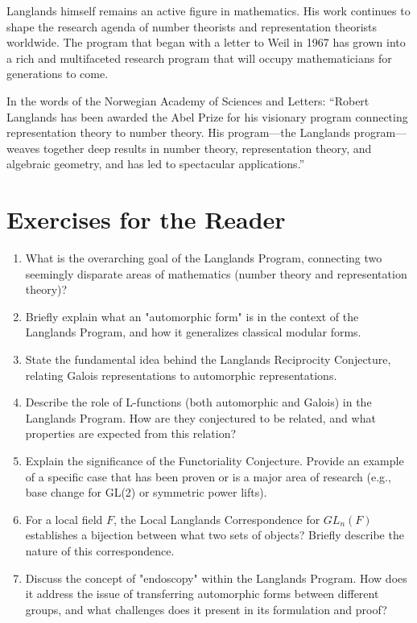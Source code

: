 Langlands himself remains an active figure in mathematics. His work continues to shape the research agenda of number theorists and representation theorists worldwide. The program that began with a letter to Weil in 1967 has grown into a rich and multifaceted research program that will occupy mathematicians for generations to come.

In the words of the Norwegian Academy of Sciences and Letters: ``Robert Langlands has been awarded the Abel Prize for his visionary program connecting representation theory to number theory. His program---the Langlands program---weaves together deep results in number theory, representation theory, and algebraic geometry, and has led to spectacular applications.''

\section*{Exercises for the Reader}
\begin{enumerate}
    \item [B] What is the overarching goal of the Langlands Program, connecting two seemingly disparate areas of mathematics (number theory and representation theory)?
    \item [B] Briefly explain what an "automorphic form" is in the context of the Langlands Program, and how it generalizes classical modular forms.
    \item [B] State the fundamental idea behind the Langlands Reciprocity Conjecture, relating Galois representations to automorphic representations.
    \item [I] Describe the role of L-functions (both automorphic and Galois) in the Langlands Program. How are they conjectured to be related, and what properties are expected from this relation?
    \item [I] Explain the significance of the Functoriality Conjecture. Provide an example of a specific case that has been proven or is a major area of research (e.g., base change for GL(2) or symmetric power lifts).
    \item [I] For a local field $F$, the Local Langlands Correspondence for $GL_n(F)$ establishes a bijection between what two sets of objects? Briefly describe the nature of this correspondence.
    \item [A] Discuss the concept of "endoscopy" within the Langlands Program. How does it address the issue of transferring automorphic forms between different groups, and what challenges does it present in its formulation and proof?
\end{enumerate}

